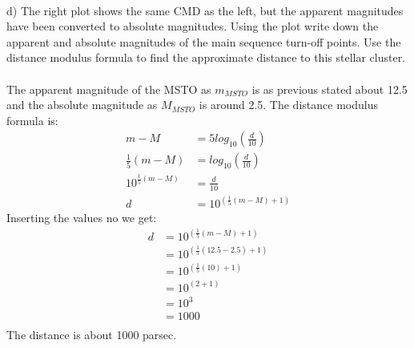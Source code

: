\\
d) The right plot shows the same CMD as the left, but the apparent magnitudes have been converted to
absolute magnitudes. Using the plot write down the apparent and absolute magnitudes of the main sequence
turn-off points. Use the distance modulus formula to find the approximate distance to this stellar 
cluster.\\
\\
The apparent magnitude of the MSTO as $m_{MSTO}$ is as previous stated about 12.5 and the absolute 
magnitude as $M_{MSTO}$ is around 2.5. The distance modulus formula is:
\begin{equation*}
  \begin{split}
    m - M &= 5 log_{10}(\frac{d}{10})\\
    \frac{1}{5} (m - M) &= log_{10}(\frac{d}{10})\\
    10^{\frac{1}{5} (m - M)} &= \frac{d}{10}\\
    d &= 10^{(\frac{1}{5} (m - M) + 1)}
  \end{split}
\end{equation*}
Inserting the values no we get:
\begin{equation*}
  \begin{split}
    d &= 10^{(\frac{1}{5} (m - M) + 1)}\\
      &= 10^{(\frac{1}{5} (12.5 - 2.5) + 1)}\\
      &= 10^{(\frac{1}{5} (10) + 1)}\\
      &= 10^{(2 + 1)}\\
      &= 10^{3}\\
      &= 1000\\
  \end{split}
\end{equation*}
The distance is about 1000 parsec.
